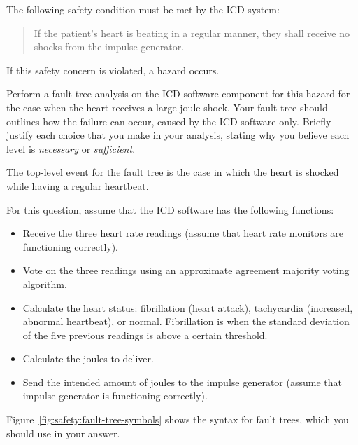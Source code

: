 The following safety condition must be met by the ICD system:

\begin{quote}

 If the patient's heart is beating in a regular manner, they shall receive no shocks from the impulse generator.

\end{quote}

If this safety concern is violated, a hazard occurs.

Perform a fault tree analysis on the ICD software component for this hazard for the case when the heart receives a large joule shock. Your fault tree should outlines how the failure can occur, caused by the ICD software only. Briefly justify each choice that you make in your analysis, stating why you believe each level is \emph{necessary} or \emph{sufficient}.

The top-level event for the fault tree is the case in which the heart is shocked while having a regular heartbeat.

For this question, assume that the ICD software has the following functions:

 \begin{itemize}
  \item Receive the three heart rate readings (assume that heart rate monitors are functioning correctly).
  \item Vote on the three readings using an approximate agreement majority voting algorithm.
  \item Calculate the heart status: fibrillation (heart attack), tachycardia (increased, abnormal heartbeat), or normal. Fibrillation is when the standard deviation of the five previous readings is above a certain threshold.
  \item Calculate the joules to deliver.
  \item Send the intended amount of joules to the impulse generator (assume that impulse generator is functioning correctly).
 \end{itemize}



Figure~\ref{fig:safety:fault-tree-symbols} shows the syntax for fault trees, which you should use in your answer. 


